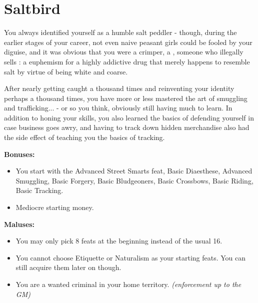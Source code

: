 \section{Saltbird}
You always identified yourself as a humble salt peddler - though, during the earlier stages of your career, not even naive peasant girls could be fooled by your diguise, and it was obvious that you were a crimper, a , someone who illegally sells : a euphemism for a highly addictive drug that merely happens to resemble salt by virtue of being white and coarse.

After nearly getting caught a thousand times and reinventing your identity perhaps a thousand times, you have more or less mastered the art of smuggling and trafficking... - or so you think, obviously still having much to learn. In addition to honing your  skills, you also learned the basics of defending yourself in case business goes awry, and having to track down hidden merchandise also had the side effect of teaching you the basics of tracking.

\textbf{Bonuses:}
\begin{itemize}
	\item You start with the Advanced Street Smarts feat, Basic Diaesthese, Advanced Smuggling, Basic Forgery, Basic Bludgeoners, Basic Crossbows, Basic Riding, Basic Tracking.
	\item Mediocre starting money.
\end{itemize}


\textbf{Maluses:}
\begin{itemize}
	\item You may only pick 8 feats at the beginning instead of the usual 16.
	\item You cannot choose Etiquette or Naturalism as your starting feats. You can still acquire them later on though.
	\item You are a wanted criminal in your home territory. \textit{(enforcement up to the GM)}
\end{itemize}
